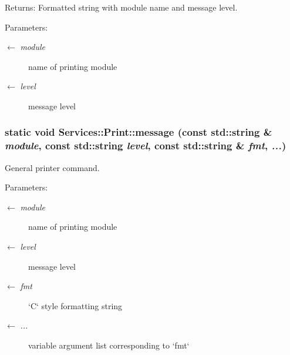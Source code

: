 \begin{Desc}
\item[Returns:]Formatted string with module name and message level.\end{Desc}
\begin{Desc}
\item[Parameters:]
\begin{description}
\item[\mbox{$\leftarrow$} {\em module}]name of printing module \item[\mbox{$\leftarrow$} {\em level}]message level \end{description}
\end{Desc}
\hypertarget{namespaceServices_1_1Print_2bfc723913ff7be28a3d64a11a973fd3}{
\subsubsection[message]{\setlength{\rightskip}{0pt plus 5cm}static void Services::Print::message (const std::string \& {\em module}, const std::string {\em level}, const std::string \& {\em fmt},  {\em ...})}}
\label{namespaceServices_1_1Print_2bfc723913ff7be28a3d64a11a973fd3}


General printer command. 

\begin{Desc}
\item[Parameters:]
\begin{description}
\item[\mbox{$\leftarrow$} {\em module}]name of printing module \item[\mbox{$\leftarrow$} {\em level}]message level \item[\mbox{$\leftarrow$} {\em fmt}]`C` style formatting string \item[\mbox{$\leftarrow$} {\em ...}]variable argument list corresponding to `fmt` \end{description}
\end{Desc}
